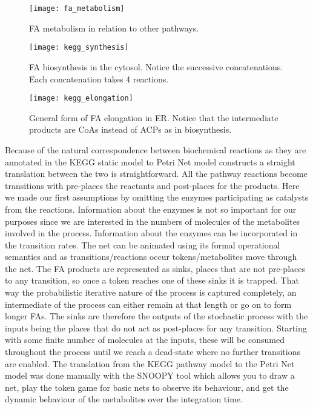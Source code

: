 \begin{figure}[htbp!]
\centering
\texttt{[image: fa\_metabolism]}
\caption[FA metabolism]{FA metabolism in relation to other pathways.}
\label{fig:fa_synthesis}
\end{figure}

\begin{figure}[htbp!]
\centering
\texttt{[image: kegg\_synthesis]}
\caption[Fatty Acid biosynthsis in cytosol]{FA biosynthesis in the
  cytosol. Notice the successive concatenations. Each concatenation
  takes 4 reactions.}
\label{fig:kegg_synthesis}
\end{figure}

\begin{figure}[htbp!]
\centering
\texttt{[image: kegg\_elongation]}
\caption[Fatty Acid elongation in ER]{General form of FA elongation in
ER. Notice that the intermediate products are CoAs instead of ACPs as
in biosynthesis.}
\label{fig:kegg_elongation}
\end{figure}

Because of the natural correspondence between biochemical reactions as
they are annotated in the KEGG static model to Petri Net model constructs
a straight translation between the two is straightforward. All the
pathway reactions become transitions with pre-places the reactants and
post-places for the products. Here we made our first assumptions by
omitting the enzymes participating as catalysts from the reactions. Information about the enzymes
is not so important for our purposes since we are interested in the
numbers of molecules of the metabolites involved in the process. Information
about the enzymes can be incorporated in the transition rates.
The net can be animated using its formal
operational semantics and as transitions/reactions occur
tokens/metabolites move through the net. The FA products are
represented as sinks, places that are not pre-places to any
transition, so once a token reaches one of these sinks it is
trapped. That way the probabilistic iterative nature of the process is
captured completely, an intermediate of the process can either remain
at that length or go on to form longer FAs. The sinks are therefore
the outputs of the stochastic process with the inputs being the places
that do not act as post-places for any transition. Starting with some
finite number of molecules at the inputs, these will be consumed
throughout the process until we reach a dead-state where no further
transitions are enabled. The translation from the KEGG pathway model
to the Petri Net model was done manually with the SNOOPY \cite []
{heiner2012snoopy}tool which
allows you to draw a net, play the token game for basic nets to
observe its behaviour, and get the dynamic behaviour of the
metabolites over the integration time.

